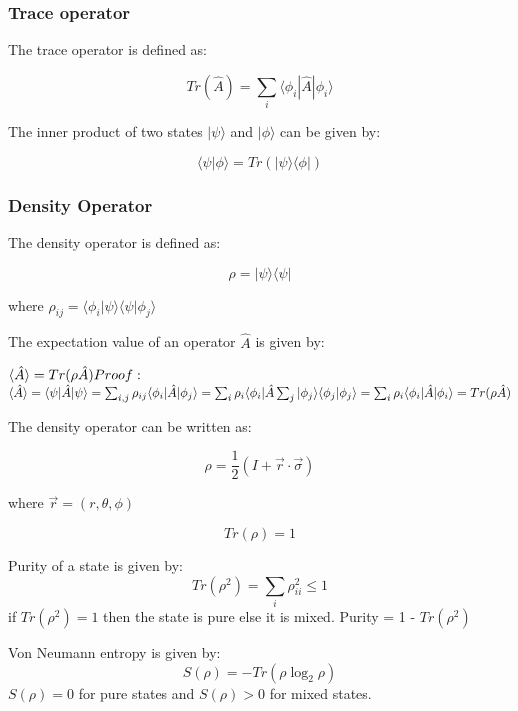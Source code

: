 \documentclass[
  letterpaper,
  DIV=11,
  numbers=noendperiod]{scrreprt}
\begin{document}
\subsubsection*{Trace operator}\label{trace-operator}

The trace operator is defined as:

\[ Tr(\hat{A}) = \sum_i \langle \phi_i | \hat{A} | \phi_i \rangle \]

The inner product of two states \(|\psi\rangle\) and \(|\phi\rangle\)
can be given by:

\[\langle \psi | \phi \rangle = Tr(|\psi\rangle \langle \phi|)\]

\subsubsection*{Density Operator}\label{density-operator}

The density operator is defined as:

\[ \rho = |\psi\rangle \langle \psi| \]

where
\(\rho_{ij} = \langle \phi_i | \psi \rangle \langle \psi | \phi_j \rangle\)

The expectation value of an operator \(\hat{A}\) is given by:

\(\langle \hat{A} \rangle = Tr(\rho \hat{A})\\Proof:\\\)
\(\langle \hat{A} \rangle = \langle \psi | \hat{A} | \psi \rangle = \sum_{i,j} \rho_{ij} \langle \phi_i | \hat{A} | \phi_j \rangle \\
= \sum_{i} \rho_{i} \langle \phi_i | \hat{A} \sum_{j} |\phi_j\rangle \langle \phi_j| \phi_j \rangle = \sum_{i} \rho_{i} \langle \phi_i | \hat{A} | \phi_i \rangle \\
= Tr(\rho \hat{A})\)

The density operator can be written as:

\[\rho = \frac{1}{2} (I + \vec{r} \cdot \vec{\sigma})\]

where \(\vec{r} = (r, \theta, \phi)\)

\[Tr(\rho) = 1\]

Purity of a state is given by:
\[Tr(\rho^2) = \sum_{i} \rho_{ii}^2 \leq 1\] if \(Tr(\rho^2) = 1\) then
the state is pure else it is mixed. Purity = 1 - \(Tr(\rho^2)\)

Von Neumann entropy is given by: \[S(\rho) = -Tr(\rho \log_2 \rho)\]
\(S(\rho) = 0\) for pure states and \(S(\rho) > 0\) for mixed states.
\end{document}
